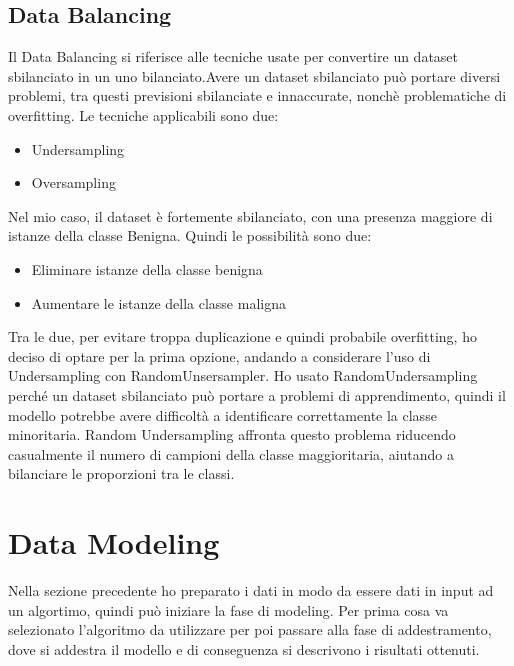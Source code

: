 \documentclass{article}
\begin{document}
\subsection{Data Balancing}
Il Data Balancing si riferisce alle tecniche usate per convertire un dataset sbilanciato in un uno bilanciato.Avere un dataset sbilanciato può portare diversi problemi, tra questi previsioni sbilanciate e
innaccurate, nonchè problematiche di overfitting. Le tecniche applicabili sono due:
\begin{itemize}
    \item Undersampling
    \item Oversampling
\end{itemize}
Nel mio caso, il dataset è fortemente sbilanciato, con una presenza maggiore di istanze della classe Benigna. Quindi le possibilità sono due:
\begin{itemize}
    \item Eliminare istanze della classe benigna
    \item Aumentare le istanze della classe maligna
\end{itemize}
Tra le due, per evitare troppa duplicazione e quindi probabile overfitting, ho deciso di optare per la prima opzione, andando a considerare l’uso di Undersampling con RandomUnsersampler. Ho usato RandomUndersampling perché un dataset sbilanciato può portare a problemi di apprendimento, quindi il modello potrebbe avere difficoltà a identificare correttamente la classe minoritaria. Random Undersampling affronta questo problema riducendo casualmente il numero di campioni della classe maggioritaria, aiutando a bilanciare le proporzioni tra le classi.

\newpage
\section{Data Modeling}
Nella sezione precedente ho preparato i dati in modo da essere dati in input ad un algortimo, quindi può iniziare la fase di modeling. Per prima cosa va selezionato l’algoritmo da utilizzare per poi passare alla fase di addestramento, dove si addestra il modello e di conseguenza si descrivono i risultati ottenuti.
\end{document}
